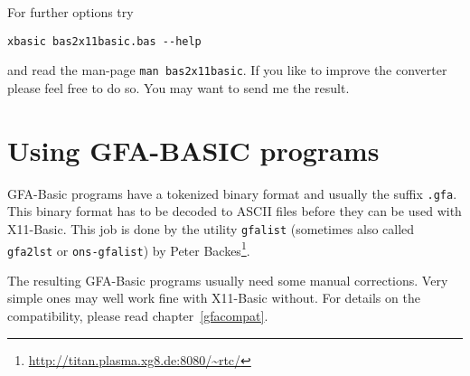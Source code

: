 For further options try 
\begin{mdframed}[hidealllines=true,backgroundcolor=black!20]
\begin{verbatim}
xbasic bas2x11basic.bas --help
\end{verbatim}
\end{mdframed}
and read the man-page \verb|man bas2x11basic|. If you like to improve 
the converter please feel free to do so. You may want to send me the result.


\section{Using GFA-BASIC programs}

GFA-Basic programs have a tokenized binary format and usually the suffix 
\verb|.gfa|.
This binary format has to be decoded to ASCII files before they can be used with
X11-Basic. This job is done by the utility \verb|gfalist| (sometimes also
called  \verb|gfa2lst| or \verb|ons-gfalist|) by Peter 
Backes\footnote{\url{http://titan.plasma.xg8.de:8080/~rtc/}}.

The resulting GFA-Basic programs usually need some manual corrections. Very
simple ones may well work fine with X11-Basic without. For details on the
compatibility, please read chapter~\ref{gfacompat}.
